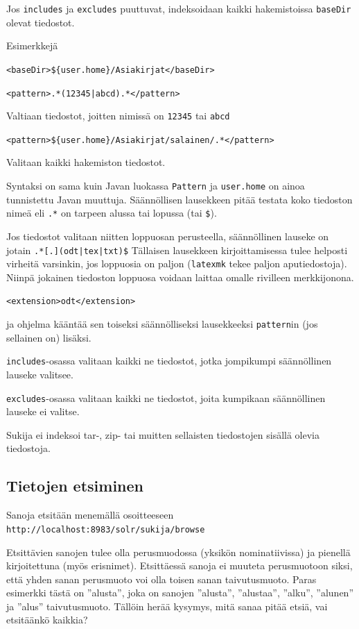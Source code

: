 \documentclass[12pt]{article}
\begin{document}
Jos \verb=includes= ja \verb=excludes= puuttuvat,
indeksoidaan kaikki hakemistoissa \verb=baseDir= olevat tiedostot.


\newpage
Esimerkkejä

\verb|<baseDir>${user.home}/Asiakirjat</baseDir>|

\bigskip
\verb=<pattern>.*(12345|abcd).*</pattern>=

Valtiaan tiedostot, joitten nimissä on \verb=12345= tai \verb=abcd= 

\verb=<pattern>${user.home}/Asiakirjat/salainen/.*</pattern>=

Valitaan kaikki hakemiston tiedostot.


\bigskip
Syntaksi on sama kuin Javan luokassa \verb=Pattern= ja
\verb=user.home= on ainoa tunnistettu Javan muuttuja.
Säännöllisen lausekkeen pitää testata koko tiedoston nimeä eli
\verb=.*= on tarpeen alussa tai lopussa (tai \verb=$=).


\bigskip
Jos tiedostot valitaan niitten loppuosan perusteella, säännöllinen
lauseke on jotain \verb=.*[.](odt|tex|txt)$= Tällaisen lausekkeen
kirjoittamisessa tulee helposti virheitä varsinkin, jos loppuosia on
paljon (\verb=latexmk= tekee paljon aputiedostoja). Niinpä jokainen
tiedoston loppuosa voidaan laittaa omalle rivilleen merkkijonona.

\verb=<extension>odt</extension>=

ja ohjelma kääntää sen toiseksi säännölliseksi lausekkeeksi
\verb=pattern=in (jos sellainen on) lisäksi.


\bigskip
\verb=includes=-osassa valitaan kaikki ne tiedostot, jotka jompikumpi
säännöllinen lauseke valitsee.

\verb=excludes=-osassa valitaan kaikki ne tiedostot, joita kumpikaan
säännöllinen lauseke ei valitse.


\bigskip
Sukija ei indeksoi tar-, zip- tai muitten sellaisten tiedostojen
sisällä olevia tiedostoja.


\subsection*{Tietojen etsiminen}

Sanoja etsitään menemällä osoitteeseen
\verb=http://localhost:8983/solr/sukija/browse=

Etsittävien sanojen tulee olla perusmuodossa (yksikön nominatiivissa)
ja pienellä kirjoitettuna (myös erisnimet). Etsittäessä sanoja ei
muuteta perusmuotoon siksi, että yhden sanan perusmuoto voi olla
toisen sanan taivutusmuoto. Paras esimerkki tästä on ''alusta'', joka
on sanojen ''alusta'', ''alustaa'', ''alku'', ''alunen'' ja ''alus''
taivutusmuoto. Tällöin herää kysymys, mitä sanaa pitää etsiä, vai
etsitäänkö kaikkia?
\end{document}
